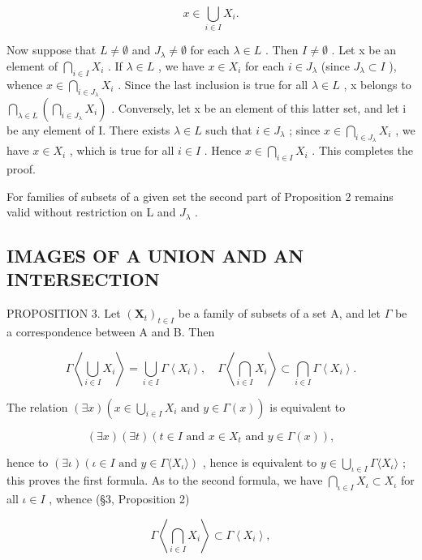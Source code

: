 \[
x \in \bigcup_ {i \in I} X _ {i}.
\]

Now suppose that \(L \neq \emptyset\) and \(J_{\lambda} \neq \emptyset\) for each \(\lambda \in L\) . Then \(I \neq \emptyset\) . Let x be an element of \(\bigcap_{i \in I} X_{i}\) . If \(\lambda \in L\) , we have \(x \in X_{i}\) for each \(i \in J_{\lambda}\) (since \(J_{\lambda} \subset I\) ), whence \(x \in \bigcap_{i \in J_{\lambda}} X_{i}\) . Since the last inclusion is true for all \(\lambda \in L\) , x belongs to \(\bigcap_{\lambda \in L} \left( \bigcap_{i \in J_{\lambda}} X_{i} \right)\) . Conversely, let x be an element of this latter set, and let i be any element of I. There exists \(\lambda \in L\) such that \(i \in J_{\lambda}\) ; since \(x \in \bigcap_{i \in J_{\lambda}} X_{i}\) , we have \(x \in X_{i}\) , which is true for all \(i \in I\) . Hence \(x \in \bigcap_{i \in I} X_{i}\) . This completes the proof.

For families of subsets of a given set the second part of Proposition 2 remains valid without restriction on L and \(J_{\lambda}\) .

\subsection{IMAGES OF A UNION AND AN INTERSECTION}

PROPOSITION 3. Let \((\mathbf{X}_t)_{t\in I}\) be a family of subsets of a set A, and let \(\Gamma\) be a correspondence between A and B. Then

\[
\Gamma \left\langle \bigcup_ {i \in I} X _ {i} \right\rangle = \bigcup_ {i \in I} \Gamma \left\langle X _ {i} \right\rangle , \quad \Gamma \left\langle \bigcap_ {i \in I} X _ {i} \right\rangle \subset \bigcap_ {i \in I} \Gamma \left\langle X _ {i} \right\rangle .
\]

The relation \((\exists x)\left(x\in \bigcup_{i\in I}X_i \text{ and } y\in \Gamma (x)\right)\) is equivalent to

\[
(\exists x) (\exists t) (t \in I \text {   and   } x \in X _ {t} \text {   and   } y \in \Gamma (x)),
\]

hence to \((\exists \iota)(\iota \in I \text{ and } y \in \Gamma\langle X_{\iota}\rangle)\) , hence is equivalent to \(y \in \bigcup_{\iota \in I} \Gamma\langle X_{\iota}\rangle\) ; this proves the first formula. As to the second formula, we have \(\bigcap_{\iota \in I} X_{\iota} \subset X_{\iota}\) for all \(\iota \in I\) , whence (§3, Proposition 2)

\[
\Gamma \left\langle \bigcap_ {i \in I} X _ {i} \right\rangle \subset \Gamma \left\langle X _ {i} \right\rangle ,
\]

